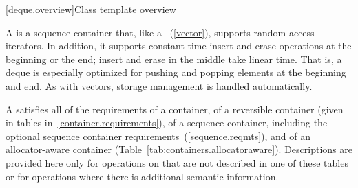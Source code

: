 [deque.overview]{Class template  overview}

\pnum
A
%
is a sequence container that, like a
~(\ref{vector}), supports random access iterators.
In addition, it supports constant time insert and erase operations at the beginning or the end;
insert and erase in the middle take linear time.
That is, a deque is especially optimized for pushing and popping elements at the beginning and end.
As with vectors, storage management is handled automatically.

\pnum
A
satisfies all of the requirements of a container, of a reversible container
(given in tables in~\ref{container.requirements}), of a sequence container,
including the optional sequence container requirements~(\ref{sequence.reqmts}), and of an allocator-aware container (Table~\ref{tab:containers.allocatoraware}).
Descriptions are provided here only for operations on
that are not described in one of these tables
or for operations where there is additional semantic information.

